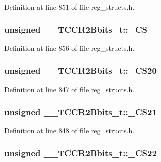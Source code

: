 Definition at line 851 of file reg\+\_\+structs.\+h.

\hypertarget{union_____t_c_c_r2_bbits__t_a0ef8303cc8da1636bf4555ae35d87bd4}{
\subsubsection[{\+\_\+\+C\+S}]{\setlength{\rightskip}{0pt plus 5cm}unsigned \+\_\+\+\_\+\+T\+C\+C\+R2\+Bbits\+\_\+t\+::\+\_\+\+C\+S}}\label{union_____t_c_c_r2_bbits__t_a0ef8303cc8da1636bf4555ae35d87bd4}


Definition at line 856 of file reg\+\_\+structs.\+h.

\hypertarget{union_____t_c_c_r2_bbits__t_ab552443787f80816a5025b21f18f0937}{
\subsubsection[{\+\_\+\+C\+S20}]{\setlength{\rightskip}{0pt plus 5cm}unsigned \+\_\+\+\_\+\+T\+C\+C\+R2\+Bbits\+\_\+t\+::\+\_\+\+C\+S20}}\label{union_____t_c_c_r2_bbits__t_ab552443787f80816a5025b21f18f0937}


Definition at line 847 of file reg\+\_\+structs.\+h.

\hypertarget{union_____t_c_c_r2_bbits__t_a11258fc5a276e9cfbf103e0f4cde2173}{
\subsubsection[{\+\_\+\+C\+S21}]{\setlength{\rightskip}{0pt plus 5cm}unsigned \+\_\+\+\_\+\+T\+C\+C\+R2\+Bbits\+\_\+t\+::\+\_\+\+C\+S21}}\label{union_____t_c_c_r2_bbits__t_a11258fc5a276e9cfbf103e0f4cde2173}


Definition at line 848 of file reg\+\_\+structs.\+h.

\hypertarget{union_____t_c_c_r2_bbits__t_a5c1467b998a4177faf540f762b4ce85d}{
\subsubsection[{\+\_\+\+C\+S22}]{\setlength{\rightskip}{0pt plus 5cm}unsigned \+\_\+\+\_\+\+T\+C\+C\+R2\+Bbits\+\_\+t\+::\+\_\+\+C\+S22}}\label{union_____t_c_c_r2_bbits__t_a5c1467b998a4177faf540f762b4ce85d}


